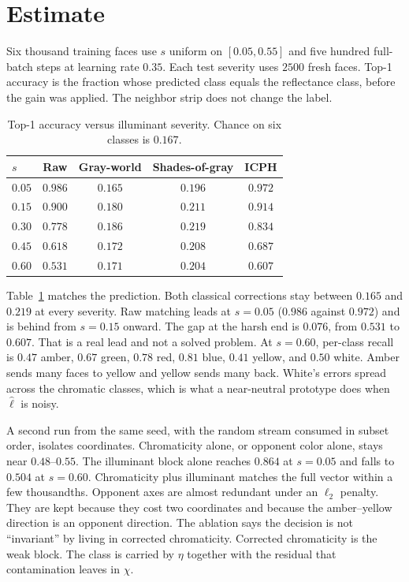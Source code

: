 \documentclass[10pt]{article}
\begin{document}
\section{Estimate}
Six thousand training faces use $s$ uniform on $[0.05,0.55]$ and five hundred full-batch steps at learning rate $0.35$. Each test severity uses $2500$ fresh faces. Top-1 accuracy is the fraction whose predicted class equals the reflectance class, before the gain was applied. The neighbor strip does not change the label.

\begin{table}[t]
\caption{Top-1 accuracy versus illuminant severity. Chance on six classes is $0.167$.}
\label{tab:acc}
\centering
\footnotesize
\setlength{\tabcolsep}{3pt}
\begin{tabular}{@{}lcccc@{}}
\toprule
$s$ & Raw & Gray-world & Shades-of-gray & ICPH \\
\midrule
$0.05$ & $0.986$ & $0.165$ & $0.196$ & $0.972$ \\
$0.15$ & $0.900$ & $0.180$ & $0.211$ & $0.914$ \\
$0.30$ & $0.778$ & $0.186$ & $0.219$ & $0.834$ \\
$0.45$ & $0.618$ & $0.172$ & $0.208$ & $0.687$ \\
$0.60$ & $0.531$ & $0.171$ & $0.204$ & $0.607$ \\
\bottomrule
\end{tabular}
\end{table}

Table~\ref{tab:acc} matches the prediction. Both classical corrections stay between $0.165$ and $0.219$ at every severity. Raw matching leads at $s=0.05$ ($0.986$ against $0.972$) and is behind from $s=0.15$ onward. The gap at the harsh end is $0.076$, from $0.531$ to $0.607$. That is a real lead and not a solved problem. At $s=0.60$, per-class recall is $0.47$ amber, $0.67$ green, $0.78$ red, $0.81$ blue, $0.41$ yellow, and $0.50$ white. Amber sends many faces to yellow and yellow sends many back. White's errors spread across the chromatic classes, which is what a near-neutral prototype does when $\hat\ell$ is noisy.

A second run from the same seed, with the random stream consumed in subset order, isolates coordinates. Chromaticity alone, or opponent color alone, stays near $0.48$--$0.55$. The illuminant block alone reaches $0.864$ at $s=0.05$ and falls to $0.504$ at $s=0.60$. Chromaticity plus illuminant matches the full vector within a few thousandths. Opponent axes are almost redundant under an $\ell_2$ penalty. They are kept because they cost two coordinates and because the amber--yellow direction is an opponent direction. The ablation says the decision is not ``invariant'' by living in corrected chromaticity. Corrected chromaticity is the weak block. The class is carried by $\eta$ together with the residual that contamination leaves in $\chi$.
\end{document}

